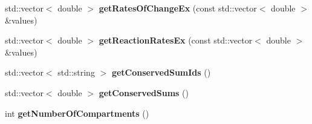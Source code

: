 \begin{DoxyCompactItemize}
\item 
\hypertarget{classrr_1_1_road_runner_af7cf29c009117099cc41b46b3e2df443}{std\-::vector$<$ double $>$ {\bfseries get\-Rates\-Of\-Change\-Ex} (const std\-::vector$<$ double $>$ \&values)}\label{classrr_1_1_road_runner_af7cf29c009117099cc41b46b3e2df443}

\item 
\hypertarget{classrr_1_1_road_runner_aac792c2a8c0a6f47cf987f64bbf0ac4f}{std\-::vector$<$ double $>$ {\bfseries get\-Reaction\-Rates\-Ex} (const std\-::vector$<$ double $>$ \&values)}\label{classrr_1_1_road_runner_aac792c2a8c0a6f47cf987f64bbf0ac4f}

\item 
\hypertarget{classrr_1_1_road_runner_a158be8a09cc4bc786c7441a72748bcd0}{std\-::vector$<$ std\-::string $>$ {\bfseries get\-Conserved\-Sum\-Ids} ()}\label{classrr_1_1_road_runner_a158be8a09cc4bc786c7441a72748bcd0}

\item 
\hypertarget{classrr_1_1_road_runner_a87974f2dd5fcb693d0dc519f645a420a}{std\-::vector$<$ double $>$ {\bfseries get\-Conserved\-Sums} ()}\label{classrr_1_1_road_runner_a87974f2dd5fcb693d0dc519f645a420a}

\item 
\hypertarget{classrr_1_1_road_runner_a2f26307521e9930a85ed5c44bae67cfa}{int {\bfseries get\-Number\-Of\-Compartments} ()}\label{classrr_1_1_road_runner_a2f26307521e9930a85ed5c44bae67cfa}


\end{DoxyCompactItemize}
